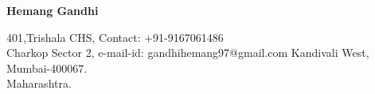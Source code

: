 \documentclass{article}
\begin{document}
	
	\begin{center}
		{
			\Large\textbf{Hemang Gandhi}
		}
		
	\end{center}
	
	\begin{flushleft}
		401,Trishala CHS, 		\hspace{2.8in}    		    Contact: +91-9167061486            \\
		Charkop Sector 2, 		\hspace{2.85in}		    e-mail-id: gandhihemang97@gmail.com \hspace{2.8in}
		Kandivali West, \\
		Mumbai-400067.     \\
		Maharashtra.\\
		
	\end{flushleft}
	\vspace{-0.3in}
	\begin{figure}[h]
		{%
		\hspace{4.4in}
\setlength{\fboxsep}{2.5pt}%
\setlength{\fboxrule}{1pt}%
%
}%
		
	\end{figure}
	
\end{document}
